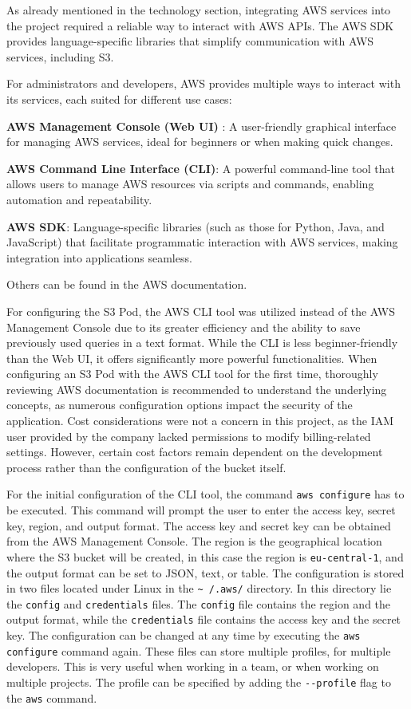 As already mentioned in the technology section, integrating AWS services into the project required a reliable way to interact with AWS APIs. The AWS SDK provides language-specific libraries that simplify communication with AWS services, including S3.

For administrators and developers, AWS provides multiple ways to interact with its services, each suited for different use cases:
\begin{compactitem}
\item \textbf{AWS Management Console (Web UI)} : A user-friendly graphical interface for managing AWS services, ideal for beginners or when making quick changes.
\item \textbf{AWS Command Line Interface (CLI)}: A powerful command-line tool that allows users to manage AWS resources via scripts and commands, enabling automation and repeatability.
\item \textbf{AWS SDK}: Language-specific libraries (such as those for Python, Java, and JavaScript) that facilitate programmatic interaction with AWS services, making integration into applications seamless.
\item Others can be found in the AWS documentation.
\end{compactitem}

For configuring the S3 Pod, the AWS CLI tool was utilized instead of the AWS Management Console due to its greater efficiency and the ability to save previously used queries in a text format. While the CLI is less beginner-friendly than the Web UI, it offers significantly more powerful functionalities. When configuring an S3 Pod with the AWS CLI tool for the first time, thoroughly reviewing AWS documentation is recommended to understand the underlying concepts, as numerous configuration options impact the security of the application. Cost considerations were not a concern in this project, as the IAM user provided by the company lacked permissions to modify billing-related settings. However, certain cost factors remain dependent on the development process rather than the configuration of the bucket itself.

For the initial configuration of the CLI tool, the command \texttt{aws configure} has to be executed. This command will prompt the user to enter the access key, secret key, region, and output format. The access key and secret key can be obtained from the AWS Management Console. The region is the geographical location where the S3 bucket will be created, in this case the region is \texttt{eu-central-1}, and the output format can be set to JSON, text, or table. The configuration is stored in two files located under Linux in the \texttt{\textasciitilde~/.aws/} directory. In this directory lie the \texttt{config} and \texttt{credentials} files. The \texttt{config} file contains the region and the output format, while the \texttt{credentials} file contains the access key and the secret key. The configuration can be changed at any time by executing the \texttt{aws configure} command again. These files can store multiple profiles, for multiple developers. This is very useful when working in a team, or when working on multiple projects. The profile can be specified by adding the \texttt{-{}-profile} flag to the \texttt{aws} command. 

